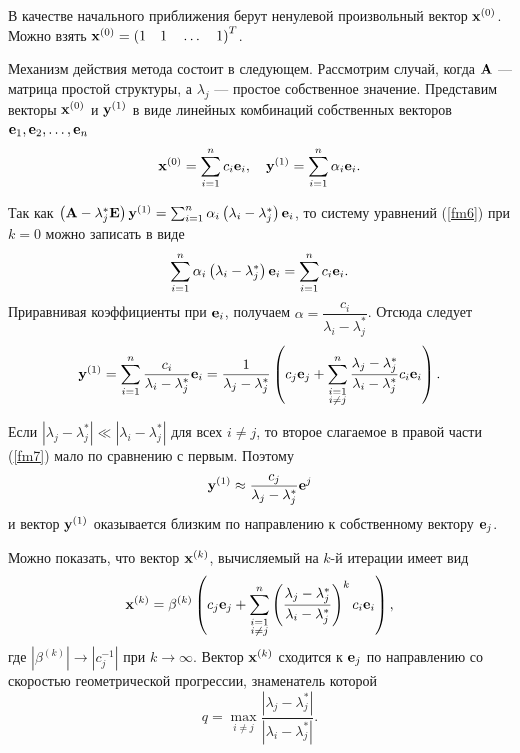 \documentclass[12pt]{article}
\begin{document}
	В качестве начального приближения берут ненулевой произвольный вектор $\bold{x}^{\left(0\right)}$. Можно взять $\bold{x}^{\left(0\right)}=\left(1\quad 1\quad \ldots\quad 1\right)^T$.
	
	Механизм действия метода состоит в следующем. Рассмотрим случай, когда $\bold{A}$ --- матрица простой структуры, а $\lambda_j$ --- простое собственное значение. Представим векторы $\bold{x}^{\left(0\right)}$ и $\bold{y}^{\left(1\right)}$ в виде линейных комбинаций собственных векторов $\bold{e}_1, \bold{e}_2,\ldots,\bold{e}_n$
	\begin{equation}
		\bold{x}^{\left(0\right)}=\sum_{i=1}^{n}c_i\bold{e}_i,\quad \bold{y}^{\left(1\right)}=\sum_{i=1}^{n}\alpha_i\bold{e}_i.
	\end{equation}
	
	Так как $\left(\bold{A}-\lambda_j^{*}\bold{E}\right)\bold{y}^{\left(1\right)}=\sum_{i=1}^{n}\alpha_i\left(\lambda_i-\lambda_j^{*}\right)\bold{e}_i$, то систему уравнений (\ref{fm6}) при $k=0$ можно записать в виде
	\begin{equation}
		\sum_{i=1}^{n}\alpha_i\left(\lambda_i-\lambda_j^{*}\right)\bold{e}_i=\sum_{i=1}^{n}c_i\bold{e}_i.
	\end{equation}
	Приравнивая коэффициенты при $\bold{e}_i$, получаем $\alpha=\dfrac{c_i}{\lambda_i-\lambda_j^{*}}$. Отсюда следует
	\begin{equation}
		\bold{y}^{\left(1\right)}=\sum_{i=1}^{n}\frac{c_i}{\lambda_i-\lambda_j^{*}}\bold{e}_i=\frac{1}{\lambda_j-\lambda_j^{*}}\left(c_j\bold{e}_j+\sum_{\substack{i=1\\i\neq j}}^{n}\frac{\lambda_j-\lambda_j^{*}}{\lambda_i-\lambda_j^{*}}c_i\bold{e}_i\right).\label{fm7}
	\end{equation}
	
	Если $\left|\lambda_j-\lambda_j^{*}\right| \ll \left|\lambda_i-\lambda_j^{*}\right|$ для всех $i\neq j$, то второе слагаемое в правой части (\ref{fm7}) мало по сравнению с первым. Поэтому
	\begin{equation}
		\bold{y}^{\left(1\right)}\approx\frac{c_j}{\lambda_j-\lambda_j^{*}}\bold{e}^{j}
	\end{equation}
	и вектор $\bold{y}^{\left(1\right)}$ оказывается близким по направлению к собственному вектору $\bold{e}_j$.
	
	Можно показать, что вектор $\bold{x}^{\left(k\right)}$, вычисляемый на $k$-й итерации имеет вид
	\begin{equation}
		\bold{x}^{\left(k\right)}=\beta^{\left(k\right)}\left(c_j\bold{e}_j+\sum_{\substack{i=1\\i\neq j}}^{n}\left(\frac{\lambda_j-\lambda_j^{*}}{\lambda_i-\lambda_j^{*}}\right)^k c_i\bold{e}_i\right),
	\end{equation}
	где $\left|\beta^{\left(k\right)}\right|\rightarrow \left|c_j^{-1}\right|$ при $k\rightarrow\infty$. Вектор $\bold{x}^{\left(k\right)}$ сходится к $\bold{e}_j$ по направлению со скоростью геометрической прогрессии, знаменатель которой
	\begin{equation}
		q=\max_{i\neq j}\frac{\left|\lambda_j-\lambda_j^{*}\right|}{\left|\lambda_i-\lambda_j^{*}\right|}.
	\end{equation}
	
\end{document}
